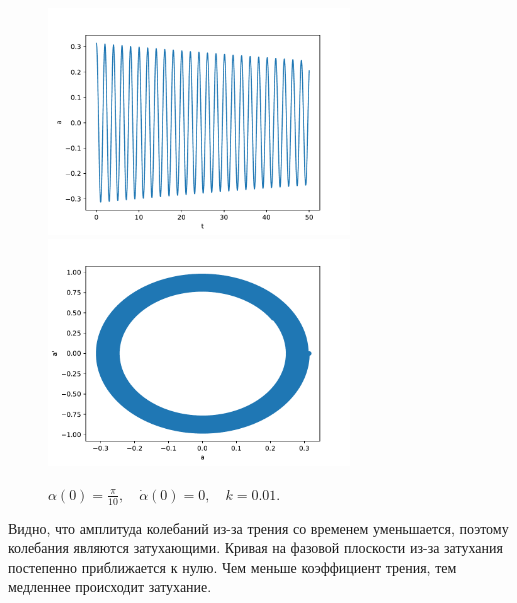             \begin{figure}[H]
                \centering
                \includegraphics[width=8cm]{pictures/3resonance2.pdf}
                \includegraphics[width=8cm]{pictures/3resonance2p.pdf}
                \caption{$\alpha(0) = \frac{\pi}{10}, \quad \dot{\alpha}(0) = 0, \quad k = 0.01$.}
            \end{figure}

            Видно, что амплитуда колебаний из-за трения со временем уменьшается, поэтому колебания являются затухающими. Кривая на фазовой плоскости из-за затухания постепенно приближается к нулю. Чем меньше коэффициент трения, тем медленнее происходит затухание.

